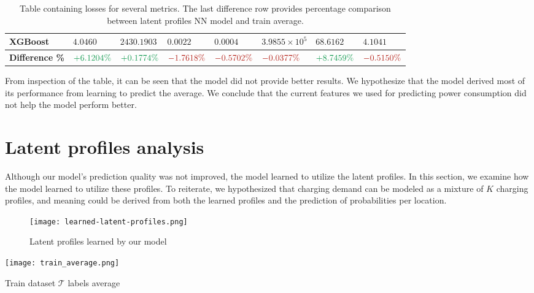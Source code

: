 \begin{table*}[h!]
\begin{tabular}{p{3cm} p{1.5cm} p{2cm} p{1.3cm} p{1.3cm} p{2cm} p{1.6cm} p{1.6cm}}
        XGBoost                      & $4.0460$                             & $2430.1903$                          & $0.0022$                          & $0.0004$                          & $3.9855\times10^{5}$              & $68.6162$                            & $4.1041$                          \\

        \midrule

        \textbf{Difference \%}       & $\textcolor{ForestGreen}{+6.1204\%}$ & $\textcolor{ForestGreen}{+0.1774\%}$ & $\textcolor{BrickRed}{-1.7618\%}$ & $\textcolor{BrickRed}{-0.5702\%}$ & $\textcolor{BrickRed}{-0.0377\%}$ & $\textcolor{ForestGreen}{+8.7459\%}$ & $\textcolor{BrickRed}{-0.5150\%}$ \\

        \bottomrule
    \end{tabular}
    \caption{Table containing losses for several metrics. The last difference row provides percentage comparison between latent profiles NN model and train average.}
    \label{tab:losses-table}
\end{table*}

From inspection of the table, it can be seen that the model did not provide better results. We hypothesize that the model derived most of its performance from learning to predict the average. We conclude that the current features we used for predicting power consumption did not help the model perform better.

\section{Latent profiles analysis}

Although our model's prediction quality was not improved, the model learned to utilize the latent profiles. In this section, we examine how the model learned to utilize these profiles. To reiterate, we hypothesized that charging demand can be modeled as a mixture of $K$ charging profiles, and meaning could be derived from both the learned profiles and the prediction of probabilities per location.

\begin{figure}
    \texttt{[image: learned-latent-profiles.png]}
    \caption{Latent profiles learned by our model}
    \label{fig:learned-latent-profiles}
\end{figure}


\begin{marginfigure}
    \texttt{[image: train\_average.png]}
    \caption{Train dataset $\mathcal{T}$ labels average}
    \label{fig:train_average}
\end{marginfigure}


